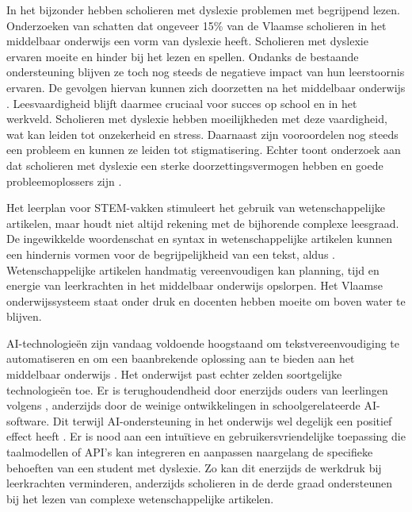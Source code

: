 In het bijzonder hebben scholieren met dyslexie problemen met begrijpend lezen. Onderzoeken van \textcite{Bonte2020, VanDerMeer2022} schatten dat ongeveer 15\% van de Vlaamse scholieren in het middelbaar onderwijs een vorm van dyslexie heeft. Scholieren met dyslexie ervaren moeite en hinder bij het lezen en spellen. Ondanks de bestaande ondersteuning blijven ze toch nog steeds de negatieve impact van hun leerstoornis ervaren. De gevolgen hiervan  kunnen zich doorzetten na het middelbaar onderwijs \autocite{Lissens2020}. Leesvaardigheid blijft daarmee cruciaal voor succes op school en in het werkveld. Scholieren met dyslexie hebben moeilijkheden met deze vaardigheid, wat kan leiden tot onzekerheid en stress. Daarnaast zijn vooroordelen nog steeds een probleem en kunnen ze leiden tot stigmatisering. Echter toont onderzoek aan dat scholieren met dyslexie een sterke doorzettingsvermogen hebben en goede probleemoplossers zijn \autocite{Ghesquiere2018, Lissens2020, Bonte2020}. 

\medspace

Het leerplan voor STEM-vakken stimuleert het gebruik van wetenschappelijke artikelen, maar houdt niet altijd rekening met de bijhorende complexe leesgraad. De ingewikkelde woordenschat en syntax in wetenschappelijke artikelen kunnen een hindernis vormen voor de begrijpelijkheid van een tekst, aldus \textcite{PlavenSigray2017}. Wetenschappelijke artikelen handmatig vereenvoudigen kan planning, tijd en energie van leerkrachten in het middelbaar onderwijs opslorpen. Het Vlaamse onderwijssysteem staat onder druk en docenten hebben moeite om boven water te blijven. 

\medspace

AI-technologieën zijn vandaag voldoende hoogstaand om tekstvereenvoudiging te automatiseren en om een baanbrekende oplossing aan te bieden aan het middelbaar onderwijs \autocite{Belpaeme2018}. Het onderwijst past echter zelden soortgelijke technologieën toe. Er is terughoudendheid door enerzijds ouders van leerlingen volgens \textcite{Martens2021a}, anderzijds door de weinige ontwikkelingen in schoolgerelateerde AI-software. Dit terwijl AI-ondersteuning in het onderwijs wel degelijk een positief effect heeft \autocite{Kraft2020}. Er is nood aan een intuïtieve en gebruikersvriendelijke toepassing die taalmodellen of API's kan integreren en aanpassen naargelang de specifieke behoeften van een student met dyslexie. Zo kan dit enerzijds de werkdruk bij leerkrachten verminderen, anderzijds scholieren in de derde graad ondersteunen bij het lezen van complexe wetenschappelijke artikelen.

